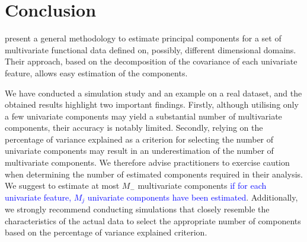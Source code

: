 \section{Conclusion} %
\label{sec:conclusion}

\cite{happMultivariateFunctionalPrincipal2018} present a general methodology to estimate principal components for a set of multivariate functional data defined on, possibly, different dimensional domains. Their approach, based on the decomposition of the covariance of each univariate feature, allows easy estimation of the components.

We have conducted a simulation study and an example on a real dataset, and the obtained results highlight two important findings. Firstly, although utilising only a few univariate components may yield a substantial number of multivariate components, their accuracy is notably limited. Secondly, relying on the percentage of variance explained as a criterion for selecting the number of univariate components may result in an underestimation of the number of multivariate components. We therefore advise practitioners to exercise caution when determining the number of estimated components required in their analysis. We suggest to estimate at most $M_{-}$ multivariate components \textcolor{blue}{if for each univariate feature, $M_j$ univariate components have been estimated}. Additionally, we strongly recommend conducting simulations that closely resemble the characteristics of the actual data to select the appropriate number of components based on the percentage of variance explained criterion.






